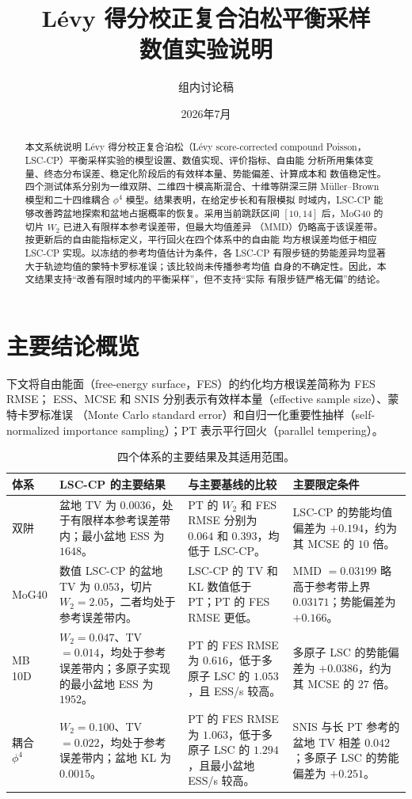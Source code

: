 \documentclass[11pt,a4paper]{article}
\title{\textbf{Lévy 得分校正复合泊松平衡采样\\
数值实验说明}}
\author{组内讨论稿}
\date{2026年7月}
\begin{document}
\maketitle

\begin{abstract}
本文系统说明 Lévy 得分校正复合泊松（Lévy score-corrected
compound Poisson，LSC-CP）平衡采样实验的模型设置、数值实现、评价指标、自由能
分析所用集体变量、终态分布误差、稳定化阶段后的有效样本量、势能偏差、计算成本和
数值稳定性。四个测试体系分别为一维双阱、二维四十模高斯混合、十维等阱深三阱
Müller--Brown 模型和二十四维耦合 $\phi^4$ 模型。结果表明，在给定步长和有限模拟
时域内，LSC-CP 能够改善跨盆地探索和盆地占据概率的恢复。采用当前跳跃区间
$[10,14]$ 后，MoG40 的切片 $W_2$ 已进入有限样本参考误差带，但最大均值差异
（MMD）仍略高于该误差带。按更新后的自由能指标定义，平行回火在四个体系中的自由能
均方根误差均低于相应 LSC-CP 实现。以冻结的参考均值估计为条件，各 LSC-CP
有限步链的势能差异均显著大于轨迹均值的蒙特卡罗标准误；该比较尚未传播参考均值
自身的不确定性。因此，本文结果支持“改善有限时域内的平衡采样”，但不支持“实际
有限步链严格无偏”的结论。
\end{abstract}

\tableofcontents
\clearpage

\section{主要结论概览}

下文将自由能面（free-energy surface，FES）的约化均方根误差简称为 FES RMSE；
ESS、MCSE 和 SNIS 分别表示有效样本量（effective sample size）、蒙特卡罗标准误
（Monte Carlo standard error）和自归一化重要性抽样（self-normalized importance
sampling）；PT 表示平行回火（parallel tempering）。

\begin{table}[H]
\centering
\small
\begin{tabularx}{\textwidth}{L{2.4cm}YYY}
\toprule
体系 & LSC-CP 的主要结果 & 与主要基线的比较 & 主要限定条件 \\
\midrule
双阱 &
盆地 TV 为 $0.0036$，处于有限样本参考误差带内；最小盆地 ESS 为 $1648$。 &
PT 的 $W_2$ 和 FES RMSE 分别为 $0.064$ 和 $0.393$，均低于 LSC-CP。 &
LSC-CP 的势能均值偏差为 $+0.194$，约为其 MCSE 的 $10$ 倍。 \\
MoG40 &
数值 LSC-CP 的盆地 TV 为 $0.053$，切片 $W_2=2.05$，二者均处于参考误差带内。 &
LSC-CP 的 TV 和 KL 数值低于 PT；PT 的 FES RMSE 更低。 &
MMD $=0.03199$ 略高于参考带上界 $0.03171$；势能偏差为 $+0.166$。 \\
MB 10D &
$W_2=0.047$、TV $=0.014$，均处于参考误差带内；多原子实现的最小盆地 ESS 为 $1952$。 &
PT 的 FES RMSE 为 $0.616$，低于多原子 LSC 的 $1.053$，且 ESS/s 较高。 &
多原子 LSC 的势能偏差为 $+0.0386$，约为其 MCSE 的 $27$ 倍。 \\
耦合 $\phi^4$ &
$W_2=0.100$、TV $=0.022$，均处于参考误差带内；盆地 KL 为 $0.0015$。 &
PT 的 FES RMSE 为 $1.063$，低于多原子 LSC 的 $1.294$，且最小盆地 ESS/s 较高。 &
SNIS 与长 PT 参考的盆地 TV 相差 $0.042$；多原子 LSC 的势能偏差为 $+0.251$。 \\
\bottomrule
\end{tabularx}
\caption{四个体系的主要结果及其适用范围。}
\end{table}
\end{document}
